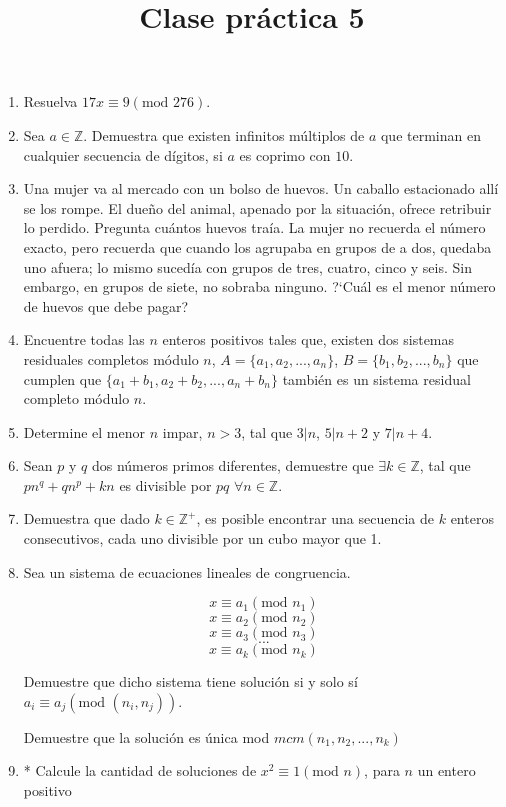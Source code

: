 \documentclass{article}
\title{Clase pr\'actica 5}
\begin{document}
\maketitle
\begin{enumerate}
    \item Resuelva $17x \equiv 9 (\text{mod } 276)$.
    \item Sea $a \in \mathbb{Z}$. Demuestra que existen infinitos m\'ultiplos de $a$ que terminan en cualquier secuencia de d\'igitos, si $a$ es coprimo con $10$.
    \item Una mujer va al mercado con un bolso de huevos. Un caballo estacionado all\'i se los rompe. El due\~no del animal, apenado por la situaci\'on, ofrece retribuir lo perdido. Pregunta cu\'antos huevos tra\'ia. La mujer no recuerda el n\'umero exacto, pero recuerda que cuando los agrupaba en grupos de a dos, quedaba uno afuera; lo mismo suced\'ia con grupos de tres, cuatro, cinco y seis. Sin embargo, en grupos de siete, no sobraba ninguno. ?`Cu\'al es el menor n\'umero de huevos que debe pagar?
    \item Encuentre todas las $n$ enteros positivos tales que, existen dos sistemas residuales completos módulo $n$, $A = \{a_1, a_2, ..., a_n\}$, $B = \{b_1, b_2, ..., b_n\}$ que cumplen que $\{a_1 + b_1, a_2 + b_2, ..., a_n + b_n\}$ también es un sistema residual completo módulo $n$.
    \item Determine el menor $n$ impar, $n > 3$, tal que $3|n$, $5|n+2$ y $7|n+4$.
    \item Sean $p$ y $q$ dos n\'umeros primos diferentes, demuestre que $\exists k \in \mathbb{Z}$, tal que $pn^{q} + qn^{p} + kn$ es divisible por $pq$ $\forall n \in \mathbb{Z}$.
    \item Demuestra que dado $k \in \mathbb{Z}^{+}$, es posible encontrar una secuencia de $k$ enteros consecutivos, cada uno divisible por un cubo mayor que 1.
    \item Sea un sistema de ecuaciones lineales de congruencia.

    $$ x \equiv a_1 (\text{mod } n_1)$$
    $$x \equiv a_2 (\text{mod } n_2)$$
    $$x \equiv a_3 (\text{mod } n_3)$$ 
    $$...$$
    $$x \equiv a_k (\text{mod } n_k) $$

    Demuestre que dicho sistema tiene solución si y solo sí $ a_i \equiv a_j (\text{mod } (n_i, n_j))$.

    Demuestre que la solución es única mod $mcm(n_1, n_2, ..., n_k)$

    \item * Calcule la cantidad de soluciones de $x^2 \equiv 1 (\text{mod } n)$, para $n$ un entero positivo
\end{enumerate}
\end{document}
